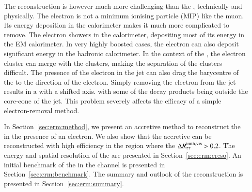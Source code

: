     The \tauhaderm reconstruction is however much more challenging 
    than the \tauhadmurm, technically and physically.
    The electron is not a minimum ionising particle (MIP) like the muon.
    Its energy deposition in the calorimeter makes it much more complicated to remove.
    The electron showers in the calorimeter, depositing most of its energy 
    in the EM calorimeter. In very highly boosted cases, 
    the electron can also deposit significant energy in the hadronic calorimeter. 
    In the context of the \tauhaderm, the electron cluster can merge with 
    the \tauhad clusters, making the separation of the clusters difficult.
    The presence of the electron in the \tauseed jet can also drag the barycentre 
    of the \tauhad to the direction of the electron. 
    Simply removing the electron from the \tauseed jet results in a \tauhad with 
    a shifted axis. with some of the \tauhad decay products being outside 
    the core-cone of the \tauseed jet. This problem severely affects the efficacy of a
    simple electron-removal method. 

    In Section~\ref{sec:erm:method}, we present an accretive method to reconstruct the 
    \tauhaderm in the presence of an electron. We also show that the accretive 
    \tauhaderm can be reconstructed with high 
    efficiency in the region where the $\Delta R_\mathrm{\tau\tau}^\mathrm{truth, vis} > 0.2$. 
    The energy and spatial resolution of the \tauhaderm are presented in
    Section~\ref{sec:erm:ereso}.
    An initial benchmark of the \tauhaderm in the \Zttehad channel is presented 
    in Section~\ref{sec:erm:benchmark}.
    The summary and outlook of the \tauhaderm reconstruction is presented 
    in Section~\ref{sec:erm:summary}.

